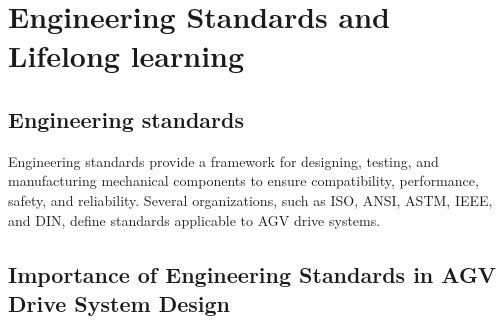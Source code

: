 \documentclass[../../main]{subfiles}
\begin{document}

\section{Engineering Standards and Lifelong learning}
\subsection{Engineering standards}
Engineering standards provide a framework for designing, testing,
and manufacturing mechanical components to ensure compatibility, 
performance, safety, and reliability. Several organizations, such as 
ISO, ANSI, ASTM, IEEE, and DIN, define standards applicable to AGV drive systems.

\subsection{Importance of Engineering Standards in AGV Drive System Design}
\end{document}
